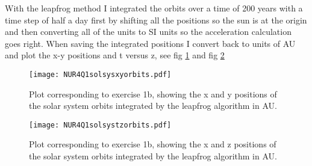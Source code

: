 With the leapfrog method I integrated the orbits over a time of 200 years with a time step of half a day first by shifting all the positions so the sun is at the origin and then converting all of the units to SI units so the acceleration calculation goes right. When saving the integrated positions I convert back to units of AU and plot the x-y positions and t versus z, see fig \ref{fig:fig3} and fig \ref{fig:fig4}

\begin{figure}[h!]
  \centering
  \texttt{[image: NUR4Q1solsysxyorbits.pdf]}
  \caption{Plot corresponding to exercise 1b, showing  the x and y positions of the solar system orbits integrated by the leapfrog algorithm in AU.}
  \label{fig:fig3}
\end{figure} 


\begin{figure}[h!]
  \centering
  \texttt{[image: NUR4Q1solsystzorbits.pdf]}
  \caption{Plot corresponding to exercise 1b, showing  the x and z positions of the solar system orbits integrated by the leapfrog algorithm in AU.}
  \label{fig:fig4}
\end{figure} 


